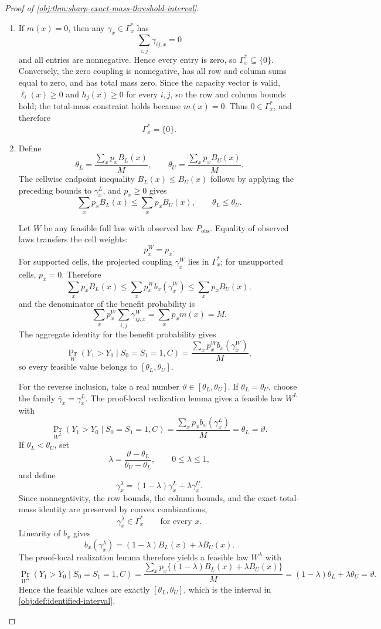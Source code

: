 \begin{proof}[Proof of \cref{obj:thm:sharp-exact-mass-threshold-interval}]
\begin{enumerate}
\item If \(m(x)=0\), then any \(\gamma_x\in\Gamma_x^\ast\) has
\[
\sum_{i,j}\gamma_{ij,x}=0
\]
and all entries are nonnegative.  Hence every entry is zero, so \(\Gamma_x^\ast\subseteq\{0\}\).  Conversely, the zero coupling is nonnegative, has all row and column sums equal to zero, and has total mass zero.  Since the capacity vector is valid, \(\ell_i(x)\ge0\) and \(h_j(x)\ge0\) for every \(i,j\), so the row and column bounds hold; the total-mass constraint holds because \(m(x)=0\).  Thus \(0\in\Gamma_x^\ast\), and therefore
\[
\Gamma_x^\ast=\{0\}.
\] %

\item Define
\[
\theta_L=\frac{\sum_xp_xB_L(x)}{M},
\qquad
\theta_U=\frac{\sum_xp_xB_U(x)}{M}.
\]
The cellwise endpoint inequality \(B_L(x)\le B_U(x)\) follows by applying the preceding bounds to \(\gamma_x^L\), and \(p_x\ge0\) gives
\[
\sum_xp_xB_L(x)\le \sum_xp_xB_U(x),
\qquad
\theta_L\le\theta_U .
\]

Let \(W\) be any feasible full law with observed law \(P_{\mathrm{obs}}\).  Equality of observed laws transfers the cell weights:
\[
p_x^W=p_x .
\]
For supported cells, the projected coupling \(\gamma_x^W\) lies in \(\Gamma_x^\ast\); for unsupported cells, \(p_x=0\).  Therefore
\[
\sum_xp_xB_L(x)
\le
\sum_xp_x^W b_x(\gamma_x^W)
\le
\sum_xp_xB_U(x),
\]
and the denominator of the benefit probability is
\[
\sum_xp_x^W\sum_{i,j}\gamma_{ij,x}^W
=
\sum_xp_xm(x)
=
M .
\]
The aggregate identity for the benefit probability gives
\[
\Pr_W(Y_1>Y_0\mid S_0=S_1=1,C)
=
\frac{\sum_xp_x^W b_x(\gamma_x^W)}{M},
\]
so every feasible value belongs to \([\theta_L,\theta_U]\).

For the reverse inclusion, take a real number \(\vartheta\in[\theta_L,\theta_U]\).  If \(\theta_L=\theta_U\), choose the family \(\bar\gamma_x=\gamma_x^L\).  The proof-local realization lemma gives a feasible law \(W^L\) with
\[
\Pr_{W^L}(Y_1>Y_0\mid S_0=S_1=1,C)
=
\frac{\sum_xp_xb_x(\gamma_x^L)}{M}
=
\theta_L
=
\vartheta .
\]
If \(\theta_L<\theta_U\), set
\[
\lambda=\frac{\vartheta-\theta_L}{\theta_U-\theta_L},
\qquad 0\le\lambda\le1,
\]
and define
\[
\gamma_x^\lambda=(1-\lambda)\gamma_x^L+\lambda\gamma_x^U .
\]
Since nonnegativity, the row bounds, the column bounds, and the exact total-mass identity are preserved by convex combinations,
\[
\gamma_x^\lambda\in\Gamma_x^\ast\qquad\text{for every }x.
\]
Linearity of \(b_x\) gives
\[
b_x(\gamma_x^\lambda)
=
(1-\lambda)B_L(x)+\lambda B_U(x).
\]
The proof-local realization lemma therefore yields a feasible law \(W^\lambda\) with
\[
\Pr_{W^\lambda}(Y_1>Y_0\mid S_0=S_1=1,C)
=
\frac{\sum_xp_x\{(1-\lambda)B_L(x)+\lambda B_U(x)\}}{M}
=
(1-\lambda)\theta_L+\lambda\theta_U
=
\vartheta .
\]
Hence the feasible values are exactly \([\theta_L,\theta_U]\), which is the interval in \cref{obj:def:identified-interval}. %
\end{enumerate}
\end{proof}

